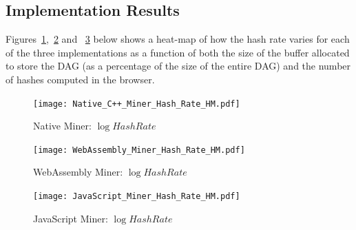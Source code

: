 \documentclass[runningheads]{llncs}
\newcommand{\trishita}[1]{{\color{magenta}\bfseries[Trishita: #1]}}
\begin{document}


\subsection{Implementation Results}
Figures~\ref{fig:NativeMinerHM},~\ref{fig:WebAsmMinerHM} and ~\ref{fig:JSMinerHM} below shows a heat-map of how the hash rate varies for each of the three implementations as a function of both the size of the buffer allocated to store the DAG (as a percentage of the size of the entire DAG) and the number of hashes computed in the browser. 

\begin{figure}[h]
\centering
\texttt{[image: Native\_C++\_Miner\_Hash\_Rate\_HM.pdf]}
\caption{\label{fig:NativeMinerHM} Native Miner: $\log{Hash Rate}$}
\end{figure}

\begin{figure}[h]
\centering
\texttt{[image: WebAssembly\_Miner\_Hash\_Rate\_HM.pdf]}
\caption{\label{fig:WebAsmMinerHM} WebAssembly Miner: $\log{Hash Rate}$}
\end{figure}

\begin{figure}[h]
\centering
\texttt{[image: JavaScript\_Miner\_Hash\_Rate\_HM.pdf]}
\caption{\label{fig:JSMinerHM} JavaScript Miner: $\log{Hash Rate}$}
\end{figure}
\end{document}
